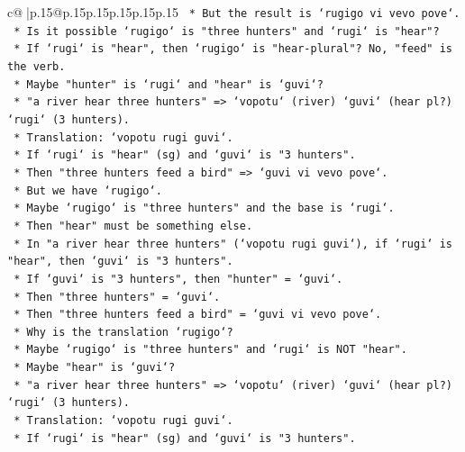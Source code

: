 \documentclass{article}
\begin{document}
{\begin{supertabular}{c@{$\;$}|p{.15\linewidth}@{}p{.15\linewidth}p{.15\linewidth}p{.15\linewidth}p{.15\linewidth}p{.15\linewidth}}
{{{\texttt{                *   But the result is `rugigo vi vevo pove`.} \\
\texttt{                *   Is it possible `rugigo` is "three hunters" and `rugi` is "hear"?} \\
\texttt{                *   If `rugi` is "hear", then `rugigo` is "hear{-}plural"? No, "feed" is the verb.} \\
\texttt{                *   Maybe "hunter" is `rugi` and "hear" is `guvi`?} \\
\texttt{                *   "a river hear three hunters" => `vopotu` (river) `guvi` (hear pl?) `rugi` (3 hunters).} \\
\texttt{                *   Translation: `vopotu rugi guvi`.} \\
\texttt{                *   If `rugi` is "hear" (sg) and `guvi` is "3 hunters".} \\
\texttt{                *   Then "three hunters feed a bird" => `guvi vi vevo pove`.} \\
\texttt{                *   But we have `rugigo`.} \\
\texttt{                *   Maybe `rugigo` is "three hunters" and the base is `rugi`.} \\
\texttt{                *   Then "hear" must be something else.} \\
\texttt{                *   In "a river hear three hunters" (`vopotu rugi guvi`), if `rugi` is "hear", then `guvi` is "3 hunters".} \\
\texttt{                *   If `guvi` is "3 hunters", then "hunter" = `guvi`.} \\
\texttt{                *   Then "three hunters" = `guvi`.} \\
\texttt{                *   Then "three hunters feed a bird" = `guvi vi vevo pove`.} \\
\texttt{                *   Why is the translation `rugigo`?} \\
\texttt{                *   Maybe `rugigo` is "three hunters" and `rugi` is NOT "hear".} \\
\texttt{                *   Maybe "hear" is `guvi`?} \\
\texttt{                *   "a river hear three hunters" => `vopotu` (river) `guvi` (hear pl?) `rugi` (3 hunters).} \\
\texttt{                *   Translation: `vopotu rugi guvi`.} \\
\texttt{                *   If `rugi` is "hear" (sg) and `guvi` is "3 hunters".} \\
}}}
\end{supertabular}}
\end{document}
